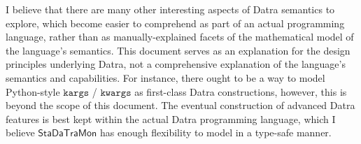 \documentclass[11pt]{article}
\newcommand{\code}[1]{\texttt{#1}}
\newcommand{\StaDaTraMon}{\mathsf{StaDaTraMon}}
\begin{document}
I believe that there are many other interesting aspects of Datra semantics
to explore, which become easier to comprehend as part of an actual
programming language, rather than as manually-explained facets of the
mathematical model of the language's semantics. This document serves as an
explanation for the design principles underlying Datra, not a comprehensive
explanation of the language's semantics and capabilities. For instance,
there ought to be a way to model Python-style \(\code{kargs}\) /
\(\code{kwargs}\) as first-class Datra constructions, however, this is
beyond the scope of this document. The eventual construction of advanced
Datra features is best kept within the actual Datra programming language,
which I believe \(\StaDaTraMon\) has enough flexibility to model in a
type-safe manner.
\end{document}

